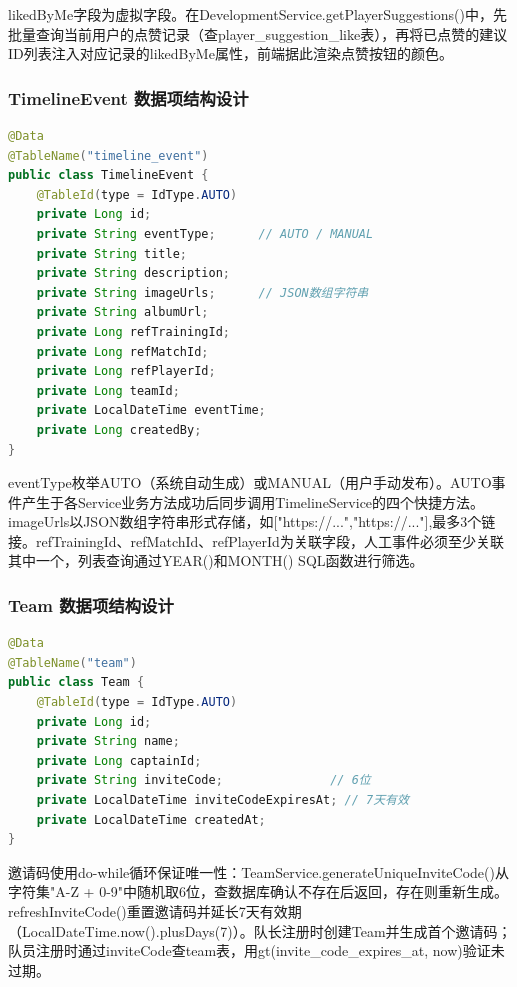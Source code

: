 \documentclass[12pt,a4paper]{ctexart}
\begin{document}
likedByMe字段为虚拟字段。在DevelopmentService.getPlayerSuggestions()中，先批量查询当前用户的点赞记录（查player\_suggestion\_like表），再将已点赞的建议ID列表注入对应记录的likedByMe属性，前端据此渲染点赞按钮的颜色。

\subsubsection{TimelineEvent 数据项结构设计}

\begin{lstlisting}[language=Java, caption=TimelineEvent.java]
@Data
@TableName("timeline_event")
public class TimelineEvent {
    @TableId(type = IdType.AUTO)
    private Long id;
    private String eventType;      // AUTO / MANUAL
    private String title;
    private String description;
    private String imageUrls;      // JSON数组字符串
    private String albumUrl;
    private Long refTrainingId;
    private Long refMatchId;
    private Long refPlayerId;
    private Long teamId;
    private LocalDateTime eventTime;
    private Long createdBy;
}
\end{lstlisting}

eventType枚举AUTO（系统自动生成）或MANUAL（用户手动发布）。AUTO事件产生于各Service业务方法成功后同步调用TimelineService的四个快捷方法。imageUrls以JSON数组字符串形式存储，如["https://...","https://..."],最多3个链接。refTrainingId、refMatchId、refPlayerId为关联字段，人工事件必须至少关联其中一个，列表查询通过YEAR()和MONTH() SQL函数进行筛选。

\subsubsection{Team 数据项结构设计}

\begin{lstlisting}[language=Java, caption=Team.java]
@Data
@TableName("team")
public class Team {
    @TableId(type = IdType.AUTO)
    private Long id;
    private String name;
    private Long captainId;
    private String inviteCode;               // 6位
    private LocalDateTime inviteCodeExpiresAt; // 7天有效
    private LocalDateTime createdAt;
}
\end{lstlisting}

邀请码使用do-while循环保证唯一性：TeamService.generateUniqueInviteCode()从字符集"A-Z + 0-9"中随机取6位，查数据库确认不存在后返回，存在则重新生成。refreshInviteCode()重置邀请码并延长7天有效期（LocalDateTime.now().plusDays(7)）。队长注册时创建Team并生成首个邀请码；队员注册时通过inviteCode查team表，用gt(invite\_code\_expires\_at, now)验证未过期。
\end{document}
